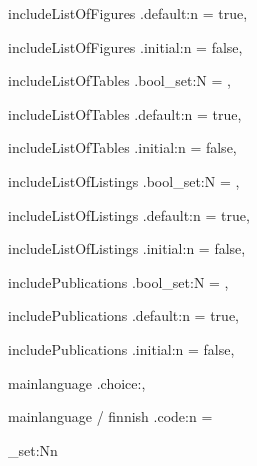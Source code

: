 {    includeListOfFigures .default:n = true,

    includeListOfFigures .initial:n = false,

    includeListOfTables .bool_set:N = \@tauthesis@includeListOfTables,

    includeListOfTables .default:n = true,

    includeListOfTables .initial:n = false,

    includeListOfListings .bool_set:N = \@tauthesis@includeListOfListings,

    includeListOfListings .default:n = true,

    includeListOfListings .initial:n = false,

    includePublications .bool_set:N = \@tauthesis@includePublications,

    includePublications .default:n = true,

    includePublications .initial:n = false,

    mainlanguage .choice:,

    mainlanguage / finnish .code:n = {
        \tl_set:Nn
        \newcommand{\@tauthesis@abstractfile}{frontmatter/tiivistelma.tex}
        \newcommand{\@tauthesis@abstractname}{Tiivistelmä}
        \newcommand{\@tauthesis@university}{Tampereen~yliopisto}
        \newcommand{\@tauthesis@keywordname}{Avainsanat}
        \newcommand{\@tauthesis@prefacename}{Alkusanat}
        \newcommand{\@tauthesis@originalitytext}{\@finoriginalitytext}
        \newcommand{\@tauthesis@logofile}{images/tau-logo-fin-eng.eps}
        \newcommand{\@tauthesis@aidisclaimertitle}{Tekoälyn~käyttö~tässä~työssä}
        \newcommand{\@tauthesis@aidisclaimerfile}{frontmatter/tekoalyn-kaytto.tex}
        \newcommand{\@tauthesis@yestextcmd}{Kyllä}
        \newcommand{\@tauthesis@notextcmd}{Ei}
        \newcommand{\@tauthesis@keywords}{\@tauthesis@fikeywords}
        \newcommand{\@tauthesis@title}{\@tauthesis@fititle}
        \newcommand{\@tauthesis@subtitle}{\@tauthesis@fisubtitle}
        \newcommand{\@tauthesis@thesistype}{\@tauthesis@fithesistype}
        \newcommand{\@tauthesis@facultyname}{\@tauthesis@fifacultyname}
        \newcommand{\@tauthesis@programmename}{\@tauthesis@fiprogrammename}
        \newcommand{\@tauthesis@subtitle@joiner}{\@tauthesis@fisubtitle@joiner}

        \newcommand{\@tauthesis@otherabstractfile}{frontmatter/abstract.tex}
        \newcommand{\@tauthesis@otherabstractname}{Abstract}
        \newcommand{\@tauthesis@otherfacultyname}{\@tauthesis@enfacultyname}
        \newcommand{\@tauthesis@otherkeywordname}{Keywords}
        \newcommand{\@tauthesis@otherkeywords}{\@tauthesis@enkeywords}
        \newcommand{\@tauthesis@otherlanguage}{english}
        \newcommand{\@tauthesis@otheroriginalitytext}{\@engoriginalitytext}
        \newcommand{\@tauthesis@otherprogrammename}{\@tauthesis@enprogrammename}
        \newcommand{\@tauthesis@othersubtitle}{\@tauthesis@ensubtitle}
        \newcommand{\@tauthesis@othersubtitle@joiner}{\@tauthesis@ensubtitle@joiner}
        \newcommand{\@tauthesis@otherthesistype}{\@tauthesis@enthesistype}
        \newcommand{\@tauthesis@othertitle}{\@tauthesis@entitle}
        \newcommand{\@tauthesis@otheruniversity}{Tampere~University}

}}
